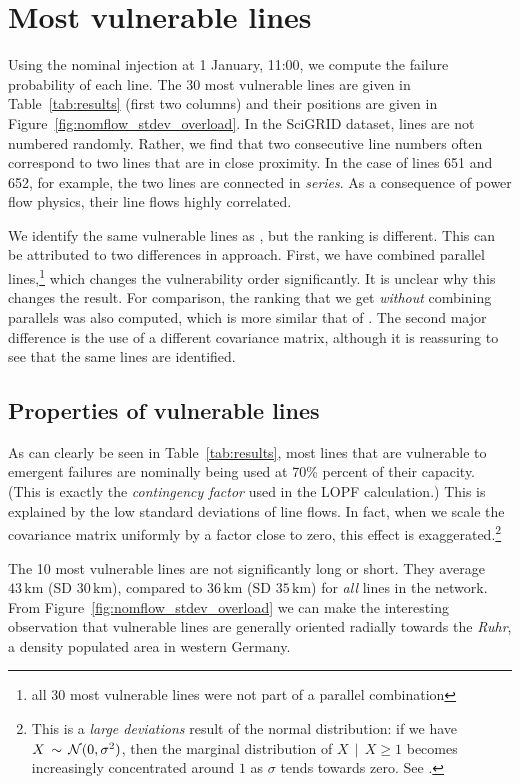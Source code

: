 \documentclass[main.tex]{subfiles}
\begin{document}
\section{Most vulnerable lines}
Using the nominal injection at 1 January, 11:00, we compute the failure probability of each line. The 30 most vulnerable lines are given in Table~\ref{tab:results} (first two columns) and their positions are given in Figure~\ref{fig:nomflow_stdev_overload}. In the SciGRID dataset, lines are not numbered randomly. Rather, we find that two consecutive line numbers often correspond to two lines that are in close proximity. In the case of lines 651 and 652, for example, the two lines are connected in \emph{series}. As a consequence of power flow physics, their line flows highly correlated.

We identify the same vulnerable lines as \cite{Nesti2018supplemental}, but the ranking is different. This can be attributed to two differences in approach. First, we have combined parallel lines,\footnote{all 30 most vulnerable lines were not part of a parallel combination} which changes the vulnerability order significantly. It is unclear why this changes the result. For comparison, the ranking that we get \emph{without} combining parallels was also computed, which is more similar that of \cite{Nesti2018supplemental}. The second major difference is the use of a different covariance matrix, although it is reassuring to see that the same lines are identified.

\subsection{Properties of vulnerable lines}
As can clearly be seen in Table~\ref{tab:results}, most lines that are vulnerable to emergent failures are nominally being used at 70\% percent of their capacity. (This is exactly the \emph{contingency factor} used in the LOPF calculation.) This is explained by the low standard deviations of line flows. In fact, when we scale the covariance matrix uniformly by a factor close to zero, this effect is exaggerated.\footnote{This is a \emph{large deviations} result of the normal distribution: if we have $X \, \sim \, \operatorname{\mathcal{N}}(0, \sigma^2)$, then the marginal distribution of $X \, \mid \, X \geq 1$ becomes increasingly concentrated around $1$ as $\sigma$ tends towards zero. See \eg \cite{Touchette2011}.}

The 10 most vulnerable lines are not significantly long or short. They average $43\,\si{\kilo\meter}$ (SD $30 \,\si{\kilo\meter}$), compared to $36\,\si{\kilo\meter}$ (SD $35 \,\si{\kilo\meter}$) for \emph{all} lines in the network. From Figure~\ref{fig:nomflow_stdev_overload} we can make the interesting observation that vulnerable lines are generally oriented radially towards the \emph{Ruhr}, a density populated area in western Germany.
\end{document}

